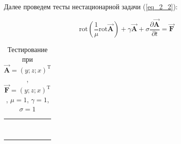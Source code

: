 Далее проведем тесты нестационарной задачи (\ref{eq_2_2}):


\begin{equation} \label{eq_2_2}
	\text{rot} \left(\frac{1}{\mu} \text{rot} \overrightarrow{\textbf{A}}\right) + \gamma \overrightarrow{\textbf{A}} + \sigma \frac{\partial \overrightarrow{\textbf{A}}}{\partial t} = \overrightarrow{\textbf{F}}
\end{equation}

\begin{table}
	\caption{Тестирование при $\overrightarrow{\textbf{A}} = (y; z; x)^{\text{T}}$, $\overrightarrow{\textbf{F}} = (y; z; x)^{\text{T}}$, $\mu = 1$, $\gamma = 1$,  $\sigma = 1$}
	\centering
	\small
	\begin{tabularx}{1.0\textwidth}{| >{\raggedright\arraybackslash}X | >{\raggedright\arraybackslash}X | >{\raggedright\arraybackslash}X |>{\raggedright\arraybackslash}X |}
		\hline
		\centering{Ребро \newline $(x_c, y_c, z_c, t)$} & \centering{Значение} & \centering{Абсолютная погрешность} & \centering{Относительная погрешность} \tabularnewline \hline
		
		
		\centering{($x; 1.0; 1.0; 0.0$)} & \centering{1.00000000E+000}& \centering{0.00000000E+000} & \centering{0.00000000E+000} \tabularnewline 
		
		\centering{($x; 2.0; 2.0; 0.0$)} & \centering{1.60000000E+001}& \centering{0.00000000E+000} & \centering{0.00000000E+000} \tabularnewline 
		
		
		
		\centering{($1.0; y; 1.0; 0.0$)} & \centering{1.00000000E+000}& \centering{0.00000000E+000} & \centering{0.00000000E+000} \tabularnewline 
		
		\centering{($2.0; y; 2.0; 0.0$)} & \centering{1.60000000E+001}& \centering{0.00000000E+000} & \centering{0.00000000E+000} \tabularnewline 
		
		
		
		\centering{($1.0; 1.0; z; 0.0$)} & \centering{1.00000000E+000}& \centering{0.00000000E+000} & \centering{0.00000000E+000} \tabularnewline 

		\centering{($2.0; 2.0; z; 0.0$)} & \centering{1.60000000E+001}& \centering{0.00000000E+000} & \centering{0.00000000E+000} \tabularnewline \hline
		
		
		\centering{($x; 1.0; 1.0; 1.0$)} & \centering{1.00000000E+000}& \centering{0.00000000E+000} & \centering{0.00000000E+000} \tabularnewline 
		
		\centering{($x; 2.0; 2.0; 1.0$)} & \centering{1.60000000E+001}& \centering{0.00000000E+000} & \centering{0.00000000E+000} \tabularnewline 
		

\end{tabularx}
\end{table}
